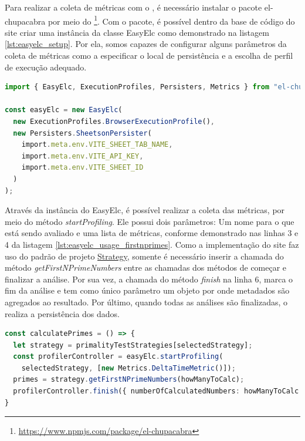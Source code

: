 \documentclass[12pt]{tcc}
\begin{document}
	Para realizar a coleta de métricas com o , é necessário instalar o pacote el-chupacabra por meio do \footnote{\url{https://www.npmjs.com/package/el-chupacabra}}.
	Com o pacote, é possível dentro da base de código do site criar uma instância da classe EasyElc como demonstrado na listagem \ref{lst:easyelc_setup}.
	Por ela, somos capazes de configurar alguns parâmetros da coleta de métricas como a especificar o local de persistência e a escolha de perfil de execução adequado.

	\begin{minipage}{\linewidth}


	\begin{lstlisting}[label={lst:easyelc_setup}, caption={Instância do módulo EasyElc no site Calculadora dos Primeiros n Números Primos.}, language=TypeScript, breaklines=true]
import { EasyElc, ExecutionProfiles, Persisters, Metrics } from "el-chupacabra"

const easyElc = new EasyElc(
  new ExecutionProfiles.BrowserExecutionProfile(),
  new Persisters.SheetsonPersister(
    import.meta.env.VITE_SHEET_TAB_NAME,
    import.meta.env.VITE_API_KEY,
    import.meta.env.VITE_SHEET_ID
  )
);
	\end{lstlisting}

	\end{minipage}

	Através da instância do EasyElc, é possível realizar a coleta das métricas, por meio do método \emph{startProfiling}.
	Ele possui dois parâmetros: Um nome para o que está sendo avaliado e uma lista de métricas, conforme demonstrado nas linhas 3 e 4 da listagem \ref{lst:easyelc_usage_firstnprimes}.
	Como a implementação do site faz uso do padrão de projeto \hyperref[subsection:strategy]{Strategy}, somente é necessário inserir a chamada do método \emph{getFirstNPrimeNumbers} entre as chamadas dos métodos de começar e finalizar a análise.
	Por sua vez, a chamada do método \emph{finish} na linha 6, marca o fim da análise e tem como único parâmetro um objeto por onde metadados são agregados ao resultado.
	Por último, quando todas as análises são finalizadas, o  realiza a persistência dos dados.

\begin{minipage}{\linewidth}
\begin{lstlisting}[label={lst:easyelc_usage_firstnprimes}, caption={Coleta de métricas usando o EasyElc no site Calculadora dos Primeiros n Números Primos.}, language=TypeScript, breaklines=true]
const calculatePrimes = () => {
  let strategy = primalityTestStrategies[selectedStrategy];
  const profilerController = easyElc.startProfiling(
    selectedStrategy, [new Metrics.DeltaTimeMetric()]);
  primes = strategy.getFirstNPrimeNumbers(howManyToCalc);
  profilerController.finish({ numberOfCalculatedNumbers: howManyToCalc });
}
\end{lstlisting}
\end{minipage}
\end{document}
